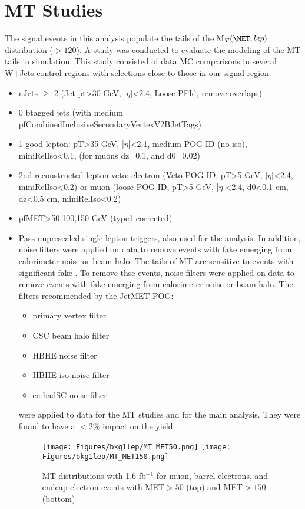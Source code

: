 \section{MT Studies}
\label{sec:MTstudies}
The signal events in this analysis populate the tails of the M$_{T}(\MET,lep)$ distribution ($>120$).  A study was conducted to evaluate the modeling of the MT tails in simulation.  This study consisted of data MC comparisons in several W+Jets control regions with selections close to those in our signal region.
\begin{itemize}
\item nJets $\ge$ 2 (Jet pt>30 GeV, |$\eta$|<2.4, Loose PFId, remove overlaps)
\item 0 btagged jets (with medium pfCombinedInclusiveSecondaryVertexV2BJetTags)
\item 1 good lepton: pT>35 GeV, |$\eta$|<2.1, medium POG ID (no iso), miniRelIso<0.1, (for muons dz=0.1, and d0=0.02)
\item 2nd reconstructed lepton veto: electron (Veto POG ID, pT>5 GeV, |$\eta$|<2.4, miniRelIso<0.2) or muon (loose POG ID, pT>5 GeV, |$\eta$|<2.4, d0<0.1 cm, dz<0.5 cm, miniRelIso<0.2)
\item pfMET>50,100,150 GeV (type1 corrected)
\item Pass unprescaled single-lepton triggers, also used for the analysis.
In addition, noise filters were applied on data to remove events with fake \MET emerging from calorimeter noise or beam halo.  
The tails of MT are sensitive to events with significant fake \MET.  To remove thse events, noise filters were applied on data to remove events with fake \MET emerging from calorimeter noise or beam halo.  The filters recommended by the JetMET POG:
\begin{itemize}
\item primary vertex filter
\item CSC beam halo filter
\item HBHE noise filter
\item HBHE iso noise filter
\item ee badSC noise filter
\end{itemize}
were applied to data for the MT studies and for the main analysis.  They were found to have a $<2\%$ impact on the yield.

\begin{figure}[h]
\texttt{[image: Figures/bkg1lep/MT\_MET50.png]}
\texttt{[image: Figures/bkg1lep/MT\_MET150.png]}
\caption{\label{fig:MTComissioning} MT distributions with 1.6 fb$^{-1}$ for muon, barrel electrons, and endcap electron events with MET$>50$ (top) and MET$>150$ (bottom)}
\end{figure}


\end{itemize}
